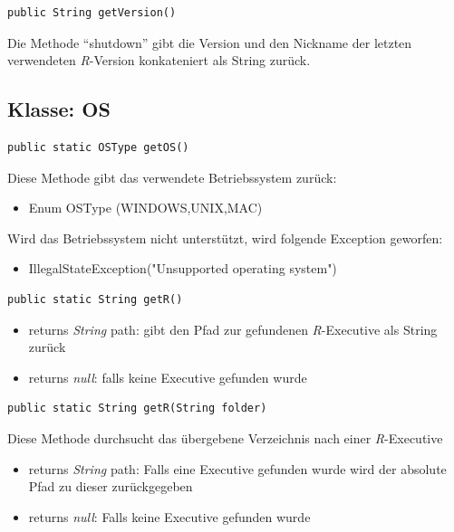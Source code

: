 \documentclass[a4paper, 12pt]{report} %
\begin{document}
\lstset{language=Java}
\begin{lstlisting}[frame=single]
public String getVersion()
\end{lstlisting}
%
Die Methode "`shutdown"' gibt die Version und den Nickname der letzten verwendeten \textit{R}-Version konkateniert als String zurück.

\subsection{Klasse: OS}

\lstset{language=Java}
\begin{lstlisting}[frame=single]
public static OSType getOS()
\end{lstlisting}
Diese Methode gibt das verwendete Betriebssystem zurück:
\begin{itemize}
	\item Enum OSType (WINDOWS,UNIX,MAC)
\end{itemize} 
Wird das Betriebssystem nicht unterstützt, wird folgende Exception geworfen:
\begin{itemize}
	\item IllegalStateException("{}Unsupported operating system"{})
\end{itemize}

 
\lstset{language=Java}
\begin{lstlisting}[frame=single]
public static String getR()
\end{lstlisting}
\begin{itemize}
	\item returns \textit{String} path: gibt den Pfad zur gefundenen \textit{R}-Executive als String zurück
	\item returns \textit{null}: falls keine Executive gefunden wurde
\end{itemize}


\lstset{language=Java}
\begin{lstlisting}[frame=single]
public static String getR(String folder)
\end{lstlisting}
Diese Methode durchsucht das übergebene Verzeichnis nach einer \textit{R}-Executive
\begin{itemize}
	\item returns \textit{String} path: Falls eine Executive gefunden wurde wird der absolute Pfad zu dieser zurückgegeben
	\item returns \textit{null}: Falls keine Executive gefunden wurde
\end{itemize}
\end{document}
